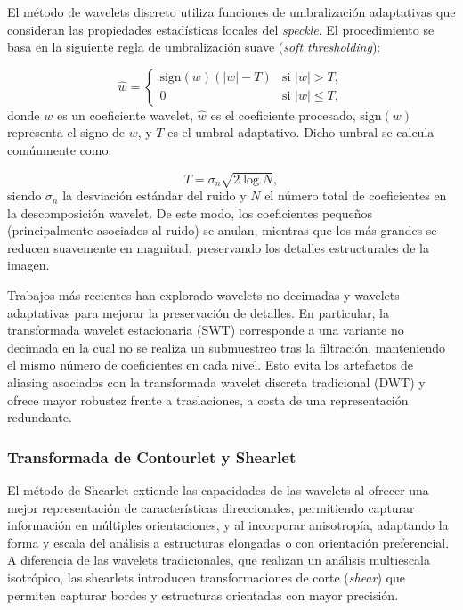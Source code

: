 El método de wavelets discreto \cite{zhang2017nonmodel} utiliza funciones de umbralización adaptativas que consideran las propiedades estadísticas locales del \emph{speckle}. El procedimiento se basa en la siguiente regla de umbralización suave (\emph{soft thresholding}):

\begin{equation}
	\hat{w} = \begin{cases} 
		\text{sign}(w)(|w| - T) & \text{si } |w| > T, \\
		0 & \text{si } |w| \leq T,
	\end{cases}
\end{equation}
donde $w$ es un coeficiente wavelet, $\hat{w}$ es el coeficiente procesado, $\text{sign}(w)$ representa el signo de $w$, y $T$ es el umbral adaptativo. Dicho umbral se calcula comúnmente como:

\begin{equation}
	T = \sigma_n \sqrt{2\log N},
\end{equation}
siendo $\sigma_n$ la desviación estándar del ruido y $N$ el número total de coeficientes en la descomposición wavelet. De este modo, los coeficientes pequeños (principalmente asociados al ruido) se anulan, mientras que los más grandes se reducen suavemente en magnitud, preservando los detalles estructurales de la imagen.

Trabajos más recientes han explorado wavelets no decimadas \cite{argenti2004speckle} y wavelets adaptativas \cite{ranjani2010dual} para mejorar la preservación de detalles. En particular, la transformada wavelet estacionaria (SWT) corresponde a una variante no decimada en la cual no se realiza un submuestreo tras la filtración, manteniendo el mismo número de coeficientes en cada nivel. Esto evita los artefactos de aliasing asociados con la transformada wavelet discreta tradicional (DWT) y ofrece mayor robustez frente a traslaciones, a costa de una representación redundante.

\subsubsection{Transformada de Contourlet y Shearlet}

El método de Shearlet \cite{hou2012shearlet} extiende las capacidades de las wavelets al ofrecer una mejor representación de características direccionales, permitiendo capturar información en múltiples orientaciones, y al incorporar anisotropía, adaptando la forma y escala del análisis a estructuras elongadas o con orientación preferencial. A diferencia de las wavelets tradicionales, que realizan un análisis multiescala isotrópico, las shearlets introducen transformaciones de corte (\emph{shear}) que permiten capturar bordes y estructuras orientadas con mayor precisión. 

